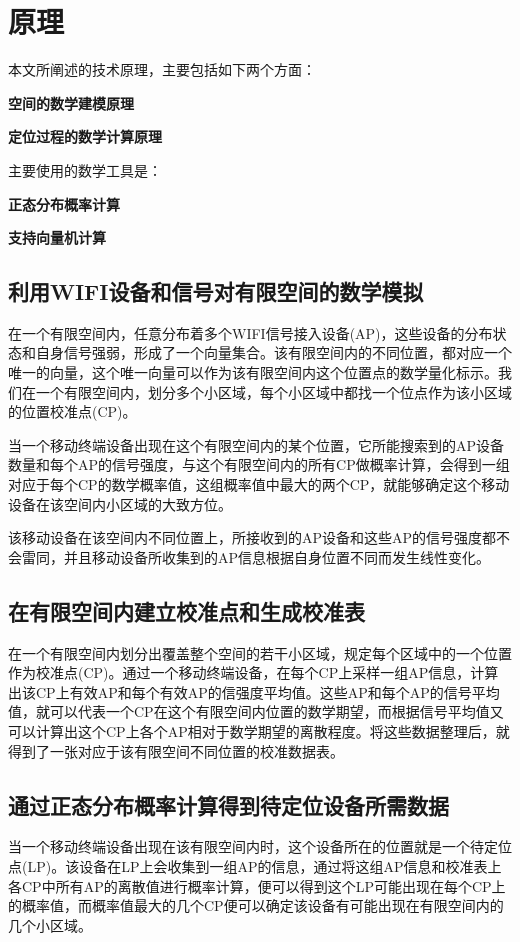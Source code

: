 \documentclass[UTF8, twocolumn ]{ctexart}
\begin{document}

\section{原理}
本文所阐述的技术原理，主要包括如下两个方面：
\begin{compactitem}
\item\textbf{空间的数学建模原理}
\item\textbf{定位过程的数学计算原理}
\end{compactitem}
\par
主要使用的数学工具是：
\begin{compactitem}
\item\textbf{正态分布概率计算}
\item\textbf{支持向量机计算}
\end{compactitem}

\subsection{利用WIFI设备和信号对有限空间的数学模拟}
在一个有限空间内，任意分布着多个WIFI信号接入设备(AP)，这些设备的分布状态和自身信号强弱，形成了一个向量集合。该有限空间内的不同位置，都对应一个唯一的向量，这个唯一向量可以作为该有限空间内这个位置点的数学量化标示。我们在一个有限空间内，划分多个小区域，每个小区域中都找一个位点作为该小区域的位置校准点(CP)。
\par
当一个移动终端设备出现在这个有限空间内的某个位置，它所能搜索到的AP设备数量和每个AP的信号强度，与这个有限空间内的所有CP做概率计算，会得到一组对应于每个CP的数学概率值，这组概率值中最大的两个CP，就能够确定这个移动设备在该空间内小区域的大致方位。
\par
该移动设备在该空间内不同位置上，所接收到的AP设备和这些AP的信号强度都不会雷同，并且移动设备所收集到的AP信息根据自身位置不同而发生线性变化。
\subsection{在有限空间内建立校准点和生成校准表}
在一个有限空间内划分出覆盖整个空间的若干小区域，规定每个区域中的一个位置作为校准点(CP)。通过一个移动终端设备，在每个CP上采样一组AP信息，计算出该CP上有效AP和每个有效AP的信强度平均值。这些AP和每个AP的信号平均值，就可以代表一个CP在这个有限空间内位置的数学期望，而根据信号平均值又可以计算出这个CP上各个AP相对于数学期望的离散程度。将这些数据整理后，就得到了一张对应于该有限空间不同位置的校准数据表。
\subsection{通过正态分布概率计算得到待定位设备所需数据}
当一个移动终端设备出现在该有限空间内时，这个设备所在的位置就是一个待定位点(LP)。该设备在LP上会收集到一组AP的信息，通过将这组AP信息和校准表上各CP中所有AP的离散值进行概率计算，便可以得到这个LP可能出现在每个CP上的概率值，而概率值最大的几个CP便可以确定该设备有可能出现在有限空间内的几个小区域。
\end{document}
